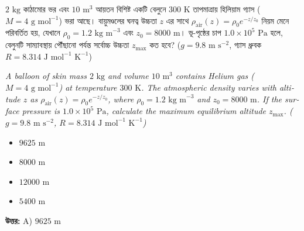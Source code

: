 \documentclass[12pt, a4paper]{article}
\begin{document}
\begin{tcolorbox}[questionbox={প্রশ্ন (Question) 2}]
    \noindent
    $2\text{ kg}$ কাঠামোর ভর এবং $10\text{ m}^3$ আয়তন বিশিষ্ট একটি বেলুনে $300\text{ K}$ তাপমাত্রায় হিলিয়াম গ্যাস ($M = 4\text{ g mol}^{-1}$) ভরা আছে। বায়ুমণ্ডলের ঘনত্ব উচ্চতা $z$ এর সাথে $\rho_{\text{air}}(z) = \rho_0 e^{-z/z_0}$ নিয়ম মেনে পরিবর্তিত হয়, যেখানে $\rho_0 = 1.2\text{ kg m}^{-3}$ এবং $z_0 = 8000\text{ m}$। ভূ-পৃষ্ঠের চাপ $1.0 \times 10^5\text{ Pa}$ হলে, বেলুনটি সাম্যাবস্থায় পৌঁছানো পর্যন্ত সর্বোচ্চ উচ্চতা $z_{\text{max}}$ কত হবে? ($g = 9.8\text{ m s}^{-2}$, গ্যাস ধ্রুবক $R = 8.314\text{ J mol}^{-1}\text{ K}^{-1}$)
    
    \vspace{0.8em}
    \begin{english}
    \noindent\textit{\color{darkgray}
    A balloon of skin mass $2\text{ kg}$ and volume $10\text{ m}^3$ contains Helium gas ($M = 4\text{ g mol}^{-1}$) at temperature $300\text{ K}$. The atmospheric density varies with altitude $z$ as $\rho_{\text{air}}(z) = \rho_0 e^{-z/z_0}$, where $\rho_0 = 1.2\text{ kg m}^{-3}$ and $z_0 = 8000\text{ m}$. If the surface pressure is $1.0 \times 10^5\text{ Pa}$, calculate the maximum equilibrium altitude $z_{\text{max}}$. ($g = 9.8\text{ m s}^{-2}$, $R = 8.314\text{ J mol}^{-1}\text{ K}^{-1}$)
    }
    \end{english}
\end{tcolorbox}

\begin{itemize}[label={}, leftmargin=1cm, itemsep=0.5em]
    \item[\textbf{A)}] $9625\text{ m}$
    \item[\textbf{B)}] $8000\text{ m}$
    \item[\textbf{C)}] $12000\text{ m}$
    \item[\textbf{D)}] $5400\text{ m}$
\end{itemize}

\vspace{0.5em}
\begin{tcolorbox}[answerbox]
    \textbf{\color{success} উত্তর:} A) $9625\text{ m}$
\end{tcolorbox}
\vspace{1em}
\end{document}
